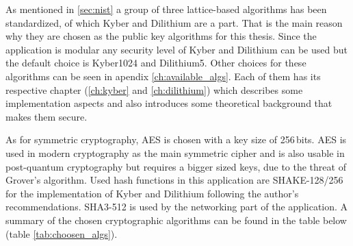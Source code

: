 As mentioned in \ref{sec:nist} a group of three lattice-based algorithms has been standardized, of which Kyber and Dilithium are a part. That is the main reason why they are chosen as the public key algorithms for this thesis. Since the application is modular any security level of Kyber and Dilithium can be used but the default choice is Kyber1024 and Dilithium5. Other choices for these algorithms can be seen in apendix \ref{ch:available_algs}. Each of them has its respective chapter (\ref{ch:kyber} and \ref{ch:dilithium}) which describes some implementation aspects and also introduces some theoretical background that makes them secure.


As for symmetric cryptography, AES is chosen with a key size of 256\,bits. AES is used in modern cryptography as the main symmetric cipher and is also usable in post-quantum cryptography but requires a bigger sized keys, due to the threat of Grover's algorithm. Used hash functions in this application are SHAKE-128/256 for the implementation of Kyber and Dilithium following the author's recommendations. SHA3-512 is used by the networking part of the application. A summary of the chosen cryptographic algorithms can be found in the table below (table \ref{tab:choosen_algs}).
